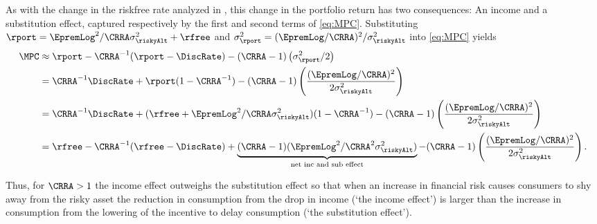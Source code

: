 {As with the change in the riskfree rate analyzed in , this change in the portfolio
return has two consequences: An income and a substitution effect,
captured respectively by the first and second terms of \eqref{eq:MPC}.
Substituting $\rport = \EpremLog^{2}/\CRRA \sigma^{2}_{\riskyAlt}+\rfree$ and $\sigma_{\rport}^{2}=(\EpremLog/\CRRA)^2/\sigma_{\riskyAlt}^{2}$ into \eqref{eq:MPC} yields
\begin{equation}\begin{gathered}\begin{aligned}
        \MPC & \approx  {\rport}-\CRRA^{-1}(\rport-\DiscRate) - (\CRRA-1)\left(\sigma_{\rport}^{2}/2\right) \label{eq:MPCsub}
\\      & =  \CRRA^{-1}\DiscRate+{\rport}(1-\CRRA^{-1}) - (\CRRA-1)\left(\frac{(\EpremLog/\CRRA)^{2}}{2 \sigma_{\riskyAlt}^{2}}\right)
\\      & =  \CRRA^{-1}\DiscRate+(\rfree+\EpremLog^{2}/\CRRA \sigma^{2}_{\riskyAlt})(1-\CRRA^{-1}) - (\CRRA-1)\left(\frac{(\EpremLog/\CRRA)^{2}}{2 \sigma_{\riskyAlt}^{2}}\right)
\\      & =  \rfree-\CRRA^{-1}(\rfree-\DiscRate)+\underbrace{(\CRRA-1)(\EpremLog^{2}/\CRRA^{2} \sigma^{2}_{\riskyAlt})}_{\text{net inc and sub effect}} - (\CRRA-1)\left(\frac{(\EpremLog/\CRRA)^{2}}{2 \sigma_{\riskyAlt}^{2}}\right)
.
\end{aligned}\end{gathered}\end{equation}

Thus, for $\CRRA > 1$ the income effect outweighs the substitution
effect so that when an increase in financial risk causes consumers to
shy away from the risky asset the reduction in consumption from the
drop in income (`the income effect') is larger than the increase in
consumption from the lowering of the incentive to delay consumption
(`the substitution effect').

}
